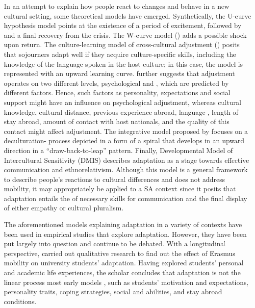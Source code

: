 \documentclass[output=paper]{langsci/langscibook}
\begin{document}
In an attempt to explain how people react to changes and behave in a new cultural setting, some theoretical models have emerged. Synthetically, the U-curve hypothesis model \citep{Lysgaard1955} points at the existence of a period of excitement, followed by  and a final recovery from the crisis. The W-curve model (\citealt{GullahornGullahorn1963}) adds a possible shock upon return. The culture-learning model of cross-cultural adjustment (\citealt{Ward2004,MasgoretWard2006}) posits that sojourners adapt well if they acquire culture-specific skills, including the knowledge of the language spoken in the host culture; in this case, the model is represented with an upward learning curve. \citet{Ward2004} further suggests that adjustment operates on two different levels, psychological and , which are predicted by different factors. Hence, such factors as personality, expectations and social support might have an influence on psychological adjustment, whereas cultural knowledge, cultural distance, previous experience abroad, language , length of stay abroad, amount of contact with host nationals, and the quality of this contact might affect  adjustment. The integrative model proposed by \citet{Kim2005} focuses on a deculturation- process depicted in a form of a spiral that develops in an upward direction in a “draw-back-to-leap” pattern. Finally,  Developmental Model of Intercultural Sensitivity (DMIS) describes adaptation as a stage towards effective  communication and ethnorelativism. Although this model is a general framework to describe people’s reactions to cultural differences and does not address mobility, it may appropriately be applied to a SA context since it posits that adaptation entails the  of necessary skills for  communication and the final display of either empathy or cultural pluralism.

The aforementioned models explaining adaptation in a variety of contexts have been used in empirical studies that explore  adaptation. However, they have been put largely into question and continue to be debated.  With a longitudinal perspective, \citet{Beaven2012} carried out qualitative research to find out the effect of Erasmus mobility on  university students’ adaptation. Having explored students’ personal and academic life experiences, the scholar concludes that adaptation is not the linear process most early models \cite{Bennett1993}, such as students’ motivation and expectations, personality traits, coping strategies, social and  abilities, and stay abroad conditions. 
\end{document}
